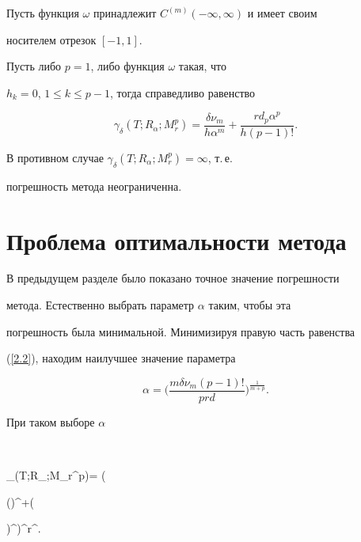 \begin{thms}\label{BThm}


Пусть функция $\omega$ принадлежит $C^{(m)}(-\infty,\infty)$ и имеет своим


носителем отрезок $[-1,1]$.


Пусть либо $p=1$, либо функция $\omega$ такая, что


$h_k=0$, $1\leq k\leq p-1$, тогда справедливо равенство


\begin{equation}\label{2.2}


\gamma_\delta(T;R_\alpha;M_r^p)=\frac{\delta


\nu_m}{h\alpha^m}+\frac{r d_p\alpha^p}{h(p-1)!}.


\end{equation}


В противном случае $\gamma_\delta(T;R_\alpha;M_r^p)=\infty $, т.\,е.


погрешность метода неограниченна.


\end{thms}





\section{Проблема оптимальности метода}





В предыдущем разделе было показано точное значение погрешности


метода. Естественно выбрать параметр $\alpha$ таким, чтобы эта


погрешность была минимальной. Минимизируя правую часть равенства


(\ref{2.2}), находим наилучшее значение параметра


$$


\alpha=\bigg(\frac{m\delta\nu_m(p-1)!}{p r d}\bigg)^{\frac{1}{m+p}}.


$$


При таком выборе $\alpha$


$$


\gamma_\delta(T;R_\alpha;M_r^p)= \bigg(


\bigg(\bigg)^{}+\bigg(


\bigg)^{}\bigg)\delta^{}r^{}.


